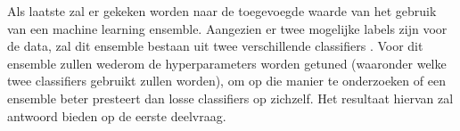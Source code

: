 \documentclass[../main.tex]{subfiles}
\begin{document}
Als laatste zal er gekeken worden naar de toegevoegde waarde van het gebruik van een machine learning ensemble. Aangezien er twee mogelijke labels zijn voor de data, zal dit ensemble bestaan uit twee verschillende classifiers \citep{bonab2016theoretical, bonab2017less}. Voor dit ensemble zullen wederom de hyperparameters worden getuned (waaronder welke twee classifiers gebruikt zullen worden), om op die manier te onderzoeken of een ensemble beter presteert dan losse classifiers op zichzelf. Het resultaat hiervan zal antwoord bieden op de eerste deelvraag.
\end{document}

